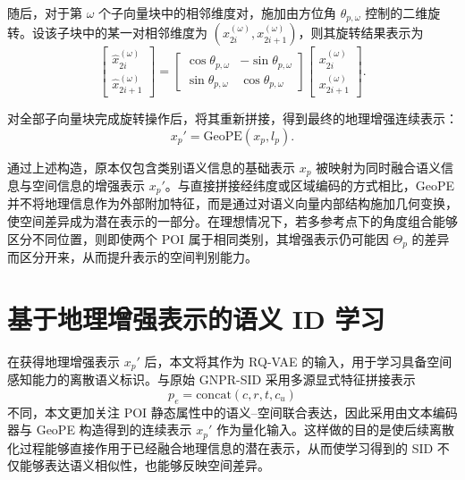 随后，对于第 $\omega$ 个子向量块中的相邻维度对，施加由方位角 $\theta_{p,\omega}$ 控制的二维旋转。设该子块中的某一对相邻维度为 $(x_{2i}^{(\omega)}, x_{2i+1}^{(\omega)})$，则其旋转结果表示为
\begin{equation}
\begin{bmatrix}
\hat{x}_{2i}^{(\omega)} \\
\hat{x}_{2i+1}^{(\omega)}
\end{bmatrix}
=
\begin{bmatrix}
\cos \theta_{p,\omega} & -\sin \theta_{p,\omega} \\
\sin \theta_{p,\omega} & \cos \theta_{p,\omega}
\end{bmatrix}
\begin{bmatrix}
x_{2i}^{(\omega)} \\
x_{2i+1}^{(\omega)}
\end{bmatrix}.
\end{equation}

对全部子向量块完成旋转操作后，将其重新拼接，得到最终的地理增强连续表示：
\begin{equation}
x_p' = \mathrm{GeoPE}(x_p, l_p).
\end{equation}

通过上述构造，原本仅包含类别语义信息的基础表示 $x_p$ 被映射为同时融合语义信息与空间信息的增强表示 $x_p'$。与直接拼接经纬度或区域编码的方式相比，GeoPE 并不将地理信息作为外部附加特征，而是通过对语义向量内部结构施加几何变换，使空间差异成为潜在表示的一部分。在理想情况下，若多参考点下的角度组合能够区分不同位置，则即使两个 POI 属于相同类别，其增强表示仍可能因 $\Theta_p$ 的差异而区分开来，从而提升表示的空间判别能力。

\section{基于地理增强表示的语义 ID 学习}
\label{sec:geo_sid_learning}

在获得地理增强表示 $x_p'$ 后，本文将其作为 RQ-VAE 的输入，用于学习具备空间感知能力的离散语义标识。与原始 GNPR-SID 采用多源显式特征拼接表示
\begin{equation}
p_e = \mathrm{concat}(c, r, t, c_u)
\end{equation}
不同，本文更加关注 POI 静态属性中的语义--空间联合表达，因此采用由文本编码器与 GeoPE 构造得到的连续表示 $x_p'$ 作为量化输入。这样做的目的是使后续离散化过程能够直接作用于已经融合地理信息的潜在表示，从而使学习得到的 SID 不仅能够表达语义相似性，也能够反映空间差异。

